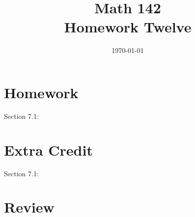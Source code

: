 \documentclass{exam}
\author{}
\date{\today}
\title{Math 142 \\ Homework Twelve}
\begin{document}
  \maketitle

  \section{Homework}
  Section 7.1: 

  \section{Extra Credit}
  Section 7.1: 

  \ifprintanswers
    \pagebreak
  \fi

  \section{Review}

  \ifprintanswers
\end{document}
